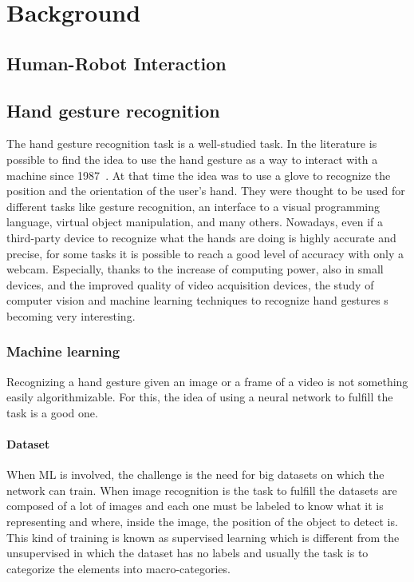 \documentclass[../thesis.tex]{subfiles}
\begin{document}
\chapter{Background}\label{cap:background}

\section{Human-Robot Interaction}

\section{Hand gesture recognition}
The hand gesture recognition task is a well-studied task. In the literature is possible to find the idea to use the hand gesture as a way to interact with a machine since 1987~\cite{article:hand_gesture_interface_device}. At that time the idea was to use a glove to recognize the position and the orientation of the user's hand. They were thought to be used for different tasks like gesture recognition, an interface to a visual programming language, virtual object manipulation, and many others. Nowadays, even if a third-party device to recognize what the hands are doing is highly accurate and precise, for some tasks it is possible to reach a good level of accuracy with only a webcam. Especially, thanks to the increase of computing power, also in small devices, and the improved quality of video acquisition devices, the study of computer vision and machine learning techniques to recognize hand gestures s becoming very interesting.

\subsection{Machine learning}
Recognizing a hand gesture given an image or a frame of a video is not something easily algorithmizable. For this, the idea of using a neural network to fulfill the task is a good one.
\subsubsection{Dataset}
When \acrshort{ML} is involved, the challenge is the need for big datasets on which the network can train. When image recognition is the task to fulfill the datasets are composed of a lot of images and each one must be labeled to know what it is representing and where, inside the image, the position of the object to detect is. This kind of training is known as supervised learning which is different from the unsupervised in which the dataset has no labels and usually the task is to categorize the elements into macro-categories.
\end{document}
